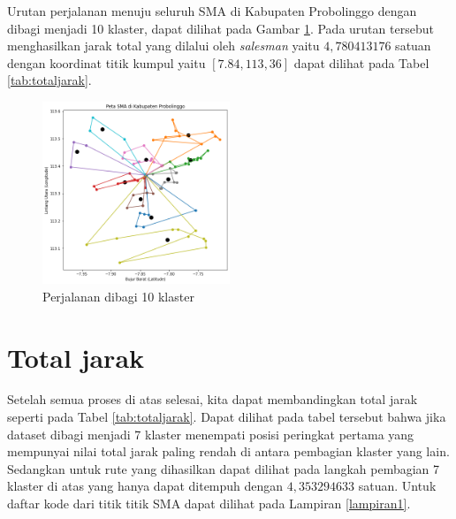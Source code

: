 Urutan perjalanan menuju seluruh SMA di Kabupaten Probolinggo dengan dibagi menjadi 10 klaster, dapat dilihat pada Gambar \ref{fig:hasil_mtsp10}. Pada urutan tersebut menghasilkan jarak total yang dilalui oleh \textit{salesman} yaitu $4,780413176$ satuan dengan koordinat titik kumpul yaitu $[7.84, 113,36]$ dapat dilihat pada Tabel \ref{tab:totaljarak}.

\begin{figure}[H]
\centering
\includegraphics[width=0.5\textwidth]{Gambar/hasil_mtsp/10}
\caption{Perjalanan dibagi 10 klaster}
\label{fig:hasil_mtsp10}
\end{figure}

\section{Total jarak}
Setelah semua proses di atas selesai, kita dapat membandingkan total jarak seperti pada Tabel \ref{tab:totaljarak}. Dapat dilihat pada tabel tersebut bahwa jika dataset dibagi menjadi 7 klaster menempati posisi peringkat pertama yang mempunyai nilai total jarak paling rendah di antara pembagian klaster yang lain. Sedangkan untuk rute yang dihasilkan dapat dilihat pada langkah pembagian 7 klaster di atas yang hanya dapat ditempuh dengan $4,353294633$ satuan. Untuk daftar kode dari titik titik SMA dapat dilihat pada Lampiran \ref{lampiran1}.

